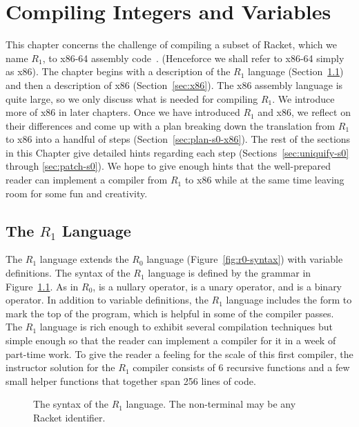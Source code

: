 \documentclass[11pt]{book}
\begin{document}
\chapter{Compiling Integers and Variables}
\label{ch:int-exp}

This chapter concerns the challenge of compiling a subset of Racket,
which we name $R_1$, to x86-64 assembly code~\citep{Intel:2015aa}.
(Henceforce we shall refer to x86-64 simply as x86).  The chapter
begins with a description of the $R_1$ language (Section~\ref{sec:s0})
and then a description of x86 (Section~\ref{sec:x86}). The
x86 assembly language is quite large, so we only discuss what is
needed for compiling $R_1$. We introduce more of x86 in later
chapters. Once we have introduced $R_1$ and x86, we reflect on
their differences and come up with a plan breaking down the
translation from $R_1$ to x86 into a handful of steps
(Section~\ref{sec:plan-s0-x86}).  The rest of the sections in this
Chapter give detailed hints regarding each step
(Sections~\ref{sec:uniquify-s0} through \ref{sec:patch-s0}).  We hope
to give enough hints that the well-prepared reader can implement a
compiler from $R_1$ to x86 while at the same time leaving room for
some fun and creativity.

\section{The $R_1$ Language}
\label{sec:s0}

The $R_1$ language extends the $R_0$ language
(Figure~\ref{fig:r0-syntax}) with variable definitions.  The syntax of
the $R_1$ language is defined by the grammar in
Figure~\ref{fig:r1-syntax}. As in $R_0$,  is a nullary
operator, \key{-} is a unary operator, and \key{+} is a binary
operator. In addition to variable definitions, the $R_1$ language
includes the  form to mark the top of the program, which
is helpful in some of the compiler passes.  The $R_1$ language is rich
enough to exhibit several compilation techniques but simple enough so
that the reader can implement a compiler for it in a week of part-time
work.  To give the reader a feeling for the scale of this first
compiler, the instructor solution for the $R_1$ compiler consists of 6
recursive functions and a few small helper functions that together
span 256 lines of code.

\begin{figure}[btp]
\centering
{}
\caption{The syntax of the $R_1$ language. 
  The non-terminal \Var{} may be any Racket identifier.}
\label{fig:r1-syntax}
\end{figure}
\end{document}
